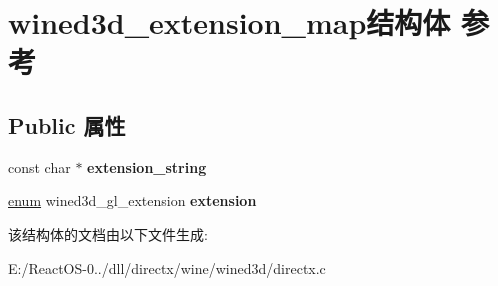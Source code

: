\hypertarget{structwined3d__extension__map}{}\section{wined3d\+\_\+extension\+\_\+map结构体 参考}
\label{structwined3d__extension__map}
\subsection*{Public 属性}
\begin{DoxyCompactItemize}
\item 
\mbox{\label{structwined3d__extension__map_a208f86fade4e58d9a1b6cba33c1f05dd}} 
const char $\ast$ {\bfseries extension\+\_\+string}
\item 
\mbox{\label{structwined3d__extension__map_ad450ffef27f2f4754310067a543c50a2}} 
\hyperlink{interfaceenum}{enum} wined3d\+\_\+gl\+\_\+extension {\bfseries extension}
\end{DoxyCompactItemize}


该结构体的文档由以下文件生成\+:\begin{DoxyCompactItemize}
\item 
E\+:/\+React\+O\+S-\/0../dll/directx/wine/wined3d/directx.\+c\end{DoxyCompactItemize}
